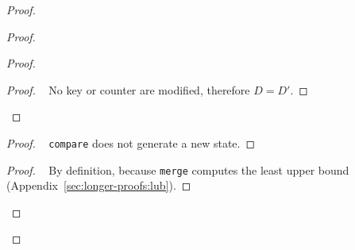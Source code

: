 \documentclass[10pt, oneside]{article}   	%
\begin{document}
\begin{proof}
\begin{proof}
\begin{proof}
			\begin{proof}
				\pf~ No key or counter are modified, therefore $D=D'$.
			\end{proof}
		\end{proof}
		
		\begin{proof}
			\pf~ \texttt{compare} does not generate a new state.
		\end{proof}
		
		\begin{proof}
			\pf~ By definition, because \texttt{merge} computes the least upper bound (Appendix~\ref{sec:longer-proofs:lub}).
		\end{proof}
	\end{proof}	
\end{proof}
\end{document}
